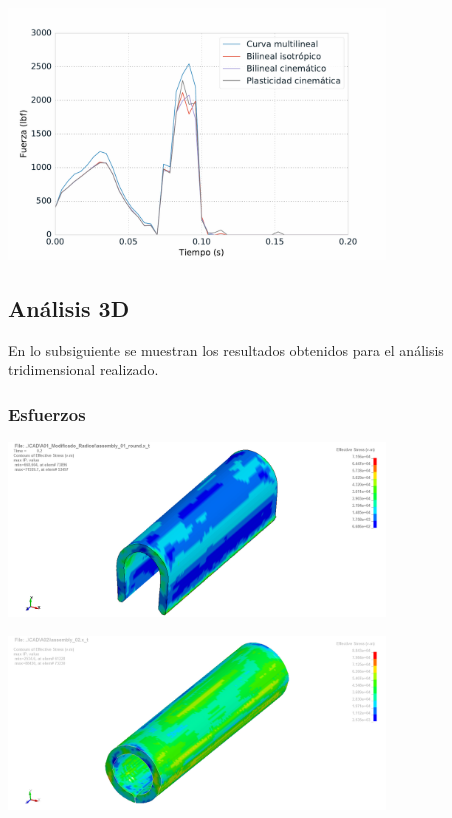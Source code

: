 \begin{center}
\includegraphics[width=0.75\textwidth]{src/ch4/mdm_force.pdf}
\label{fig:mdm_force}
\end{center}

\subsection{Análisis 3D}

En lo subsiguiente se muestran los resultados obtenidos para el análisis tridimensional 
realizado.

\subsubsection{Esfuerzos}


\begin{center}
\includegraphics[width=0.75\textwidth]{src/ch4/von_mises_3D_01.png}
\label{fig:von_mises_3D_01}
\end{center}

\begin{center}
\includegraphics[width=0.75\textwidth]{src/ch4/von_mises_3D_02.png}
\label{fig:von_mises_3D_02}
\end{center}

